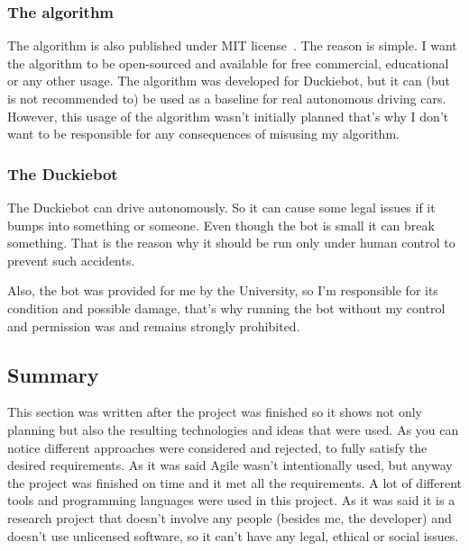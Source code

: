 \subsubsection{The algorithm}
The algorithm is also published under MIT license~\cite{mit}. The reason is simple. I want the algorithm to be open-sourced and available for free commercial, 
educational or any other usage. The algorithm was developed for Duckiebot, but it can (but is not recommended to) be
used as a baseline for real autonomous driving cars. However, this usage of the algorithm wasn't initially planned that's why I don't want to be responsible for any consequences of
misusing my algorithm.
\subsubsection{The Duckiebot}
The Duckiebot can drive autonomously. So it can cause some legal issues if it bumps into something or someone. Even though the bot is small it can break something. 
That is the reason why it should be run only under human control to prevent such accidents. 

Also, the bot was provided for me by the University, so I'm responsible for its condition and possible damage, that's why running the bot without my control and permission 
was and remains strongly prohibited. 
\subsection{Summary}
This section was written after the project was finished so it shows not only planning but also the resulting technologies and ideas that were used.
As you can notice different approaches were considered and rejected, to fully satisfy the desired requirements. As it was said Agile wasn't intentionally used, 
but anyway the project was finished on time and it met all the requirements. A lot of different tools and programming languages were used in this project.
As it was said it is a research project that doesn't involve any people (besides me, the developer) and doesn't use unlicensed software, so it can't have any legal, 
ethical or social issues.
